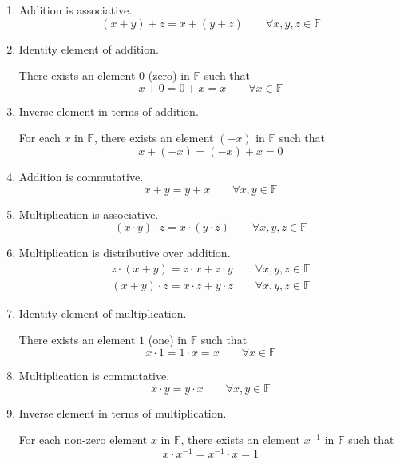 \begin{enumerate}[label = (\arabic*)]
	\item Addition is associative.
	      \[
		      (x + y) + z = x + (y + z)\qquad\forall x, y, z\in\mathbb{F}
	      \]
	\item Identity element of addition.

	      There exists an element $0$ (zero) in $\mathbb{F}$ such that
	      \[
		      x + 0 = 0 + x = x\qquad\forall x\in\mathbb{F}
	      \]
	\item Inverse element in terms of addition.

	      For each $x$ in $\mathbb{F}$, there exists an element $(-x)$ in $\mathbb{F}$ such that
	      \[
		      x + (-x) = (-x) + x = 0
	      \]
	\item Addition is commutative.
	      \[
		      x + y = y + x\qquad\forall x, y\in\mathbb{F}
	      \]
	\item Multiplication is associative.
	      \[
		      (x\cdot y)\cdot z = x\cdot (y\cdot z)\qquad\forall x, y, z\in\mathbb{F}
	      \]
	\item Multiplication is distributive over addition.
	      \[
		      \begin{split}
			      z\cdot (x + y) = z\cdot x + z\cdot y\qquad\forall x, y, z\in\mathbb{F} \\
			      (x + y)\cdot z = x\cdot z + y\cdot z\qquad\forall x, y, z\in\mathbb{F}
		      \end{split}
	      \]
	\item Identity element of multiplication.

	      There exists an element $1$ (one) in $\mathbb{F}$ such that
	      \[
		      x\cdot 1 = 1\cdot x = x\qquad\forall x\in\mathbb{F}
	      \]
	\item Multiplication is commutative.
	      \[
		      x\cdot y = y\cdot x\qquad\forall x, y\in\mathbb{F}
	      \]
	\item Inverse element in terms of multiplication.

	      For each non-zero element $x$ in $\mathbb{F}$, there exists an element $x^{-1}$ in $\mathbb{F}$ such that
	      \[
		      x\cdot x^{-1} = x^{-1}\cdot x = 1
	      \]
\end{enumerate}

